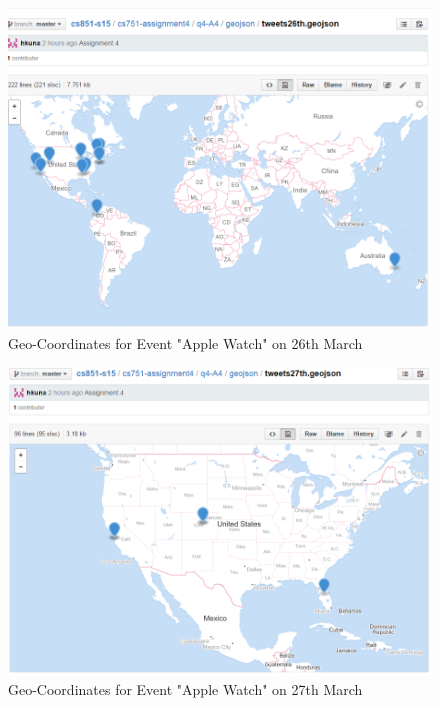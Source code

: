 \documentclass[12pt]{Report}
\begin{document}
\begin{figure}[ht]    
    \begin{center}
        \includegraphics[scale=0.60]{geojson26th.png}
        \caption{Geo-Coordinates for Event "Apple Watch" on 26th March }
        \label{Geo-Coordinates for Event "Apple Watch" on 26th March}
    \end{center}
\end{figure}


\begin{figure}[ht]    
    \begin{center}
        \includegraphics[scale=0.60]{geojson27th.png}
        \caption{Geo-Coordinates for Event "Apple Watch" on 27th March }
        \label{Geo-Coordinates for Event "Apple Watch" on 27th March}
    \end{center}
\end{figure}
\end{document}
